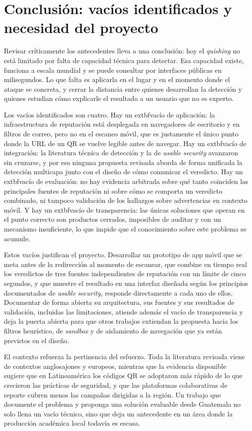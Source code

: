 \section{Conclusión: vacíos identificados y necesidad del proyecto}

Revisar críticamente los antecedentes lleva a una conclusión: hoy el \emph{quishing}
no está limitado por falta de capacidad técnica para detectar. Esa capacidad existe,
funciona a escala mundial y se puede consultar por interfaces públicas en milisegundos.
Lo que falta es aplicarla en el lugar y en el momento donde el ataque se concreta, y
cerrar la distancia entre quienes desarrollan la detección y quienes estudian cómo
explicarle el resultado a un usuario que no es experto.

Los vacíos identificados son cuatro. Hay un 	extbf{vacío de aplicación}: la
infraestructura de reputación está desplegada en navegadores de escritorio y en filtros
de correo, pero no en el escaneo móvil, que es justamente el único punto donde la URL de
un QR se vuelve legible antes de navegar. Hay un 	extbf{vacío de integración}: la
literatura técnica de detección y la de \emph{usable security} avanzaron sin cruzarse, y
por eso ninguna propuesta revisada aborda de forma unificada la detección multicapa junto
con el diseño de cómo comunicar el veredicto. Hay un 	extbf{vacío de evaluación}: no hay
evidencia arbitrada sobre qué tanto coinciden las principales fuentes de reputación ni
sobre cómo se comporta un veredicto combinado, ni tampoco validación de los hallazgos
sobre advertencias en contexto móvil. Y hay un 	extbf{vacío de transparencia}: las
únicas soluciones que operan en el punto correcto son productos cerrados, imposibles de
auditar y con un mecanismo insuficiente, lo que impide que el conocimiento sobre este
problema se acumule.

Estos vacíos justifican el proyecto. Desarrollar un prototipo de app móvil que se
meta antes de la redirección al momento de escanear, que combine en tiempo real los
veredictos de tres fuentes independientes de reputación con un límite de cinco segundos,
y que muestre el resultado en una interfaz diseñada según los principios documentados de
\emph{usable security}, responde directamente a cada uno de ellos. Documentar de forma
abierta su arquitectura, sus fuentes y sus resultados de validación, incluidas las
limitaciones, atiende además el vacío de transparencia y deja la puerta abierta para que
otros trabajos extiendan la propuesta hacia los filtros heurístico, de \emph{sandbox} y de
aislamiento de navegación que ya están previstos en el diseño.

El contexto refuerza la pertinencia del esfuerzo. Toda la literatura revisada viene de
contextos anglosajones y europeos, mientras que la evidencia disponible sugiere que en
Latinoamérica los códigos QR se adoptaron más rápido de lo que crecieron las prácticas de
seguridad, y que las plataformas colaborativas de reporte cubren menos las campañas
dirigidas a la región. Un trabajo que documente el problema y proponga una solución
evaluable desde Guatemala no solo llena un vacío técnico, sino que deja un antecedente en
un área donde la producción académica local todavía es escasa.